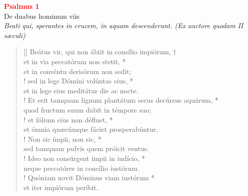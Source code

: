 \thispagestyle{plain}




\def\greinitialformat#1{%
{\fontsize{39}{39}\selectfont #1}%
}




\vspace{0.3cm}
\begin{center}
 \textcolor{red}{\large \bf Psalmus 1}\\
De duabus hominum viis\\
\textit{\small Beati qui, sperantes in crucem, in aquam descenderunt. (Ex auctore quodam II sæculi)}
\end{center}
\begin{verse}[\versewidth]
Beátus vir, qui non ábiit in consílio impiórum, †\\
et in via peccatórum non stetit, *\\
et in convéntu derisórum non sedit;\\!
\vin  sed in lege Dómini volúntas eius, *\\
\vin  et in lege eius meditátur die ac nocte.\\!
Et erit tamquam lignum \verselinebreak plantátum secus decúrsus aquárum, *\\
quod fructum suum dabit in témpore suo;\\!
\vin  et fólium eius non défluet, *\\
\vin  et ómnia quæcúmque fáciet prosperabúntur.\\!
Non sic ímpii, non sic, *\\
sed tamquam pulvis quem próicit ventus.\\!
\vin  Ideo non consúrgent ímpii in iudício, *\\
\vin  neque peccatóres in concílio iustórum.\\!
Quóniam novit Dóminus viam iustórum *\\
et iter impiórum períbit.\\
\end{verse}
\vspace{1cm}


